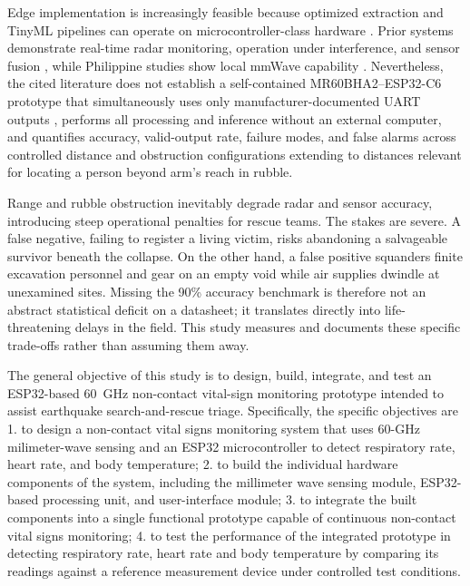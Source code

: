 \documentclass[10pt,conference]{IEEEtran}
\begin{document}
Edge implementation is increasingly feasible because optimized extraction and TinyML pipelines can operate on microcontroller-class hardware \cite{gao2022,yahyati2025,orsag2023}. Prior systems demonstrate real-time radar monitoring, operation under interference, and sensor fusion \cite{marty2023,kawasaki2023,tanna2023}, while Philippine studies show local mmWave capability \cite{herrera2023,ilagan2023}. Nevertheless, the cited literature does not establish a self-contained MR60BHA2--ESP32-C6 prototype that simultaneously uses only manufacturer-documented UART outputs \cite{seeed_mr60bha2}, performs all processing and inference without an external computer, and quantifies accuracy, valid-output rate, failure modes, and false alarms across controlled distance and obstruction configurations extending to distances relevant for locating a person beyond arm's reach in rubble.

Range and rubble obstruction inevitably degrade radar and sensor accuracy, introducing steep operational penalties for rescue teams. The stakes are severe. A false negative, failing to register a living victim, risks abandoning a salvageable survivor beneath the collapse. On the other hand, a false positive squanders finite excavation personnel and gear on an empty void while air supplies dwindle at unexamined sites. Missing the 90\% accuracy benchmark is therefore not an abstract statistical deficit on a datasheet; it translates directly into life-threatening delays in the field. This study measures and documents these specific trade-offs rather than assuming them away. 

The general objective of this study is to design, build, integrate, and test an ESP32-based 60~GHz non-contact vital-sign monitoring prototype intended to assist earthquake search-and-rescue triage. Specifically, the specific objectives are 1. to design a non-contact vital signs monitoring system that uses 60-GHz milimeter-wave sensing and an ESP32 microcontroller to detect respiratory rate, heart rate, and body temperature; 2. to build the individual hardware components of the system, including the millimeter wave sensing module, ESP32-based processing unit, and user-interface module; 3. to integrate the built components into a single functional prototype capable of continuous non-contact vital signs monitoring; 4. to test the performance of the integrated prototype in detecting respiratory rate, heart rate and body temperature by comparing its readings against a reference measurement device under controlled test conditions.
\end{document}
